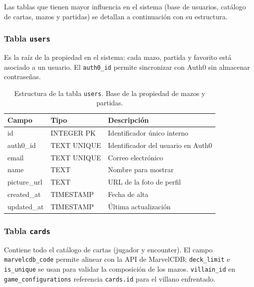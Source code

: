 Las tablas que tienen mayor influencia en el sistema (base de usuarios, catálogo de cartas, mazos y partidas) se detallan a continuación con su estructura.

\subsubsection{Tabla \texttt{users}}

Es la raíz de la propiedad en el sistema: cada mazo, partida y favorito está asociado a un usuario. El \texttt{auth0\_id} permite sincronizar con Auth0 sin almacenar contraseñas.

\begin{table}[H]
    \centering
    \small
    \begin{tabular}{|l|l|l|}
        \hline
        \textbf{Campo} & \textbf{Tipo} & \textbf{Descripción} \\
        \hline
        id & INTEGER PK & Identificador único interno \\
        auth0\_id & TEXT UNIQUE & Identificador del usuario en Auth0 \\
        email & TEXT UNIQUE & Correo electrónico \\
        name & TEXT & Nombre para mostrar \\
        picture\_url & TEXT & URL de la foto de perfil \\
        created\_at & TIMESTAMP & Fecha de alta \\
        updated\_at & TIMESTAMP & Última actualización \\
        \hline
    \end{tabular}
    \caption{Estructura de la tabla \texttt{users}. Base de la propiedad de mazos y partidas.}
    \label{tab:users}
\end{table}

\subsubsection{Tabla \texttt{cards}}

Contiene todo el catálogo de cartas (jugador y encounter). El campo \texttt{marvelcdb\_code} permite alinear con la API de MarvelCDB; \texttt{deck\_limit} e \texttt{is\_unique} se usan para validar la composición de los mazos. \texttt{villain\_id} en \texttt{game\_configurations} referencia \texttt{cards.id} para el villano enfrentado.

